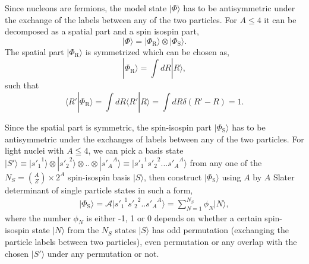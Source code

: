 \documentclass[12pt,letterpaper,UTF8]{report}
\begin{document}
Since nucleons are fermions, the model state $|\Phi \rangle$ has to be antisymmetric under the exchange of the labels between any of the two particles. For $A\leq 4$ it can be decomposed as a spatial part and a spin isospin part,
\begin{equation}
|\Phi \rangle =  |\Phi_\textrm{R} \rangle \otimes | \Phi_\textrm{S} \rangle.\label{Phi}
\end{equation}
The spatial part $|\Phi_\textrm{R} \rangle$ is symmetrized which can be chosen as,
\begin{equation}
|\Phi_\textrm{R} \rangle
= \int dR  | R \rangle, \label{PhiR}
\end{equation}
such that
\begin{equation}
\langle R'|\Phi_\textrm{R} \rangle=\int dR \langle R'  | R \rangle = \int dR \delta(R'-R)=1. \label{normPhiR}
\end{equation}


Since the spatial part is symmetric, the spin-isospin part $|\Phi_\textrm{S} \rangle$ has to be antisymmetric under the exchanges of labels between any of the two particles.
For light nuclei with $A\leqq 4$, we can pick a basis state
$|S' \rangle \equiv  | {s'_1}^1\rangle \otimes | {s'_2}^2 \rangle \otimes .. \otimes | {s'_A}^A \rangle
\equiv | {s'_1}^1 {s'_2}^2 ...{s'_A}^A \rangle$ from any one of the $N_S=\binom {A}{Z}\times 2^A$ spin-isospin basis $| S \rangle$, then construct $|\Phi_\textrm{S} \rangle$ using $A$ by $A$ Slater determinant of single particle states in such a form,
\begin{eqnarray}
|\Phi_\textrm{S} \rangle \!=\!
\mathcal{A}   | {s'_1}^1 {s'_2}^2 .. {s'_A}^A \rangle
= \sum_{N=1}^{N_S} \phi_{N} | N \rangle,
\label{PhiS}
\end{eqnarray}
where the number $\phi_{N}$ is either -1, 1 or 0 depends on whether a certain spin-isospin state $| N \rangle$ from the $N_S$ states $| S \rangle$ has odd permutation (exchanging the particle labels between two particles), even permutation or any overlap with the chosen $| S' \rangle$ under any permutation or not.
\end{document}
